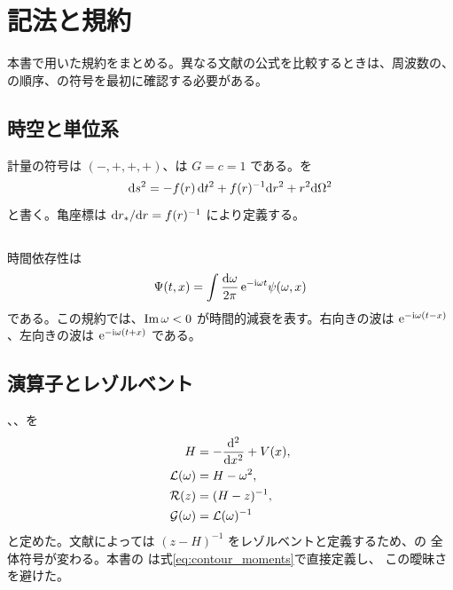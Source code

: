 \chapter{記法と規約}
\label{app:conventions}

本書で用いた規約をまとめる。異なる文献の公式を比較するときは、周波数の、
 の順序、の符号を最初に確認する必要がある。

\section{時空と単位系}

計量の符号は $(-,+,+,+)$、は $G=c=1$ である。を
\begin{equation}
\mathrm{d} s^2
=
-f(r)\,\mathrm{d} t^2
+f(r)^{-1}\mathrm{d} r^2
+r^2\mathrm{d}\Omega^2
\end{equation}
と書く。亀座標は $\mathrm{d}r_*/\mathrm{d} r=f(r)^{-1}$ により定義する。

\section{}

時間依存性は
\begin{equation}
\Psi(t,x)
=
\int
\frac{\mathrm{d}\omega}{2\pi}
\,
\mathrm{e}^{-\mathrm{i}\omega t}
\psi(\omega,x)
\end{equation}
である。この規約では、$\operatorname{Im}\omega<0$ が時間的減衰を表す。右向きの波は
$\mathrm{e}^{-\mathrm{i}\omega(t-x)}$、左向きの波は $\mathrm{e}^{-\mathrm{i}\omega(t+x)}$ である。

\section{演算子とレゾルベント}

、、を
\begin{align}
H
&=
-\frac{\mathrm{d}^2}{\mathrm{d} x^2}+V(x),
\\
\mathcal{L}(\omega)
&=
H-\omega^2,
\\
\mathcal{R}(z)
&=
(H-z)^{-1},
\\
\mathcal{G}(\omega)
&=
\mathcal{L}(\omega)^{-1}
\end{align}
と定めた。文献によっては $(z-H)^{-1}$ をレゾルベントと定義するため、の
全体符号が変わる。本書の  は式\eqref{eq:contour_moments}で直接定義し、
この曖昧さを避けた。

